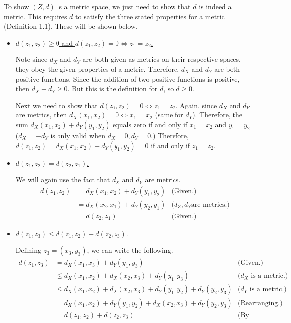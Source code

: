 \begin{solution}

To show $(Z, d)$ is a metric space, we just need to show that $d$ is indeed a metric. This requires $d$ to satisfy the three stated properties for a metric (Definition 1.1). These will be shown below. 
\begin{itemize}[-]
    \item \underline{$d(z_1, z_2) \geq 0$ and $d(z_1, z_2) = 0 \iff z_1 = z_2$.}

    \jump
    Note since $d_X$ and $d_Y$ are both given as metrics on their respective spaces, they obey the given properties of a metric. Therefore, $d_X$ and $d_Y$ are both positive functions. Since the addition of two positive functions is positive, then $d_X + d_Y \geq 0$. But this is the definition for $d$, so $d \geq 0$. \par

    Next we need to show that $d(z_1, z_2) = 0 \iff z_1 = z_2.$ Again, since $d_X$ and $d_Y$ are metrics, then $d_X(x_1, x_2) = 0 \iff x_1 = x_2$ (same for $d_Y$). Therefore, the sum $d_X(x_1, x_2) + d_Y(y_1, y_2)$ equals zero if and only if $x_1 = x_2$ and $y_1 = y_2$ ($d_X = -d_Y$ is only valid when $d_X = 0, d_Y = 0$.) Therefore, $d(z_1, z_2) = d_X(x_1, x_2) + d_Y(y_1, y_2) = 0$ if and only if $z_1 = z_2$.

    \item \underline{$d(z_1, z_2) = d(z_2, z_1)$.}

    \jump
    We will again use the fact that $d_X$ and $d_Y$ are metrics. 
    \tightalignbreak
    \begin{align*}
        d(z_1, z_2) &= d_X(x_1, x_2) + d_Y(y_1, y_2) &\text{(Given.)}\\
        &= d_X(x_2, x_1) + d_Y(y_2, y_1) &(d_Z, d_Y \text{are metrics.)}\\
        &= d(z_2, z_1) &\text{(Given.)}
    \end{align*}
    \endtightalignbreak
\newpage
    \item \underline{$d(z_1, z_3) \leq d(z_1, z_2) + d(z_2, z_3)$.}

    \jump
    Defining $z_3 = (x_3, y_3)$, we can write the following. 
    \tightalignbreak
    \begin{align*}
        d(z_1, z_3) &= d_X(x_1, x_3) + d_Y(y_1, y_3) &\text{(Given.)}\\
        &\leq d_X(x_1, x_2) + d_X(x_2, x_3) + d_Y(y_1, y_3) &\text{($d_X$ is a metric.)}\\
        &\leq d_X(x_1, x_2) + d_X(x_2, x_3) + d_Y(y_1, y_2) + d_Y(y_2, y_3) &\text{($d_Y$ is a metric.)}\\
        &= d_X(x_1, x_2) + d_Y(y_1, y_2) + d_X(x_2, x_3) + d_Y(y_2, y_3) &\text{(Rearranging.)}\\
        &= d(z_1, z_2) + d(z_2, z_3) &\text{(By definition.)}
    \end{align*}
    \endtightalignbreak
\end{itemize}
\end{solution}

